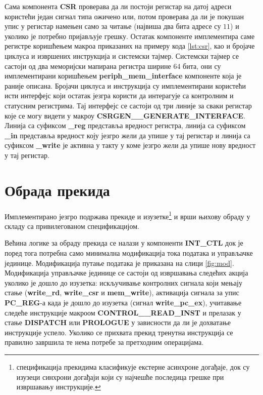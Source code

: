 Сама компонента \textbf{CSR} проверава да ли постоји регистар на датој адреси користећи један сигнал типа ожичено или, потом проверава да ли је покушан упис у регистар намењен само за читање (највиша два бита адресе су $11$) и уколико је потребно пријављује грешку. Остатак компоненте имплементира саме регистре коришћењем макроа приказаних на примеру кода \ref{lst:csr}, као и бројаче циклуса и извршених инструкција и системски тајмер. Системски тајмер се састоји од два меморијски мапирана регистра ширине 64 бита, они су имплементирани коришћењем \textbf{periph\_mem\_interface} компоненте која је раније описана. Бројачи циклуса и инструкција су имплементирани користећи исти интерфејс који остатак језгра користи да интерагује са контролним и статусним регистрима. Тај интерфејс се састоји од три линије за сваки регистар које се могу видети у макроу \textbf{CSRGEN\_\_GENERATE\_INTERFACE}. Линија са суфиксом \textbf{\_reg} представља вредност регистра, линија са суфиксом \textbf{\_in} представља вредност коју језгро жели да упише у тај регистар и линија са суфиксом \textbf{\_write} је активна у такту у коме језгро жели да упише нову вредност у тај регистар.



\section{Обрада прекида}

Имплементирано језгро подржава прекиде и изузетке\footnote{ спецификација прекидима класификује екстерне асинхроне догађаје, док су изузеци синхрони догађаји који су најчешће последица грешке при извршавању инструкције.} и врши њихову обраду у складу са привилегованом спецификацијом\cite{priv_spec}.

Већина логике за обраду прекида се налази у компоненти \textbf{INT\_CTL} док је поред тога потребна само минимална модификација тока података и управљачке јединице.
Модификација путање података је приказана на слици \ref{fig:mod}. Модификација управљачке јединице се састоји од извршавања следећих акција уколико је дошло до изузетка:
искључивање контролних сигнала који мењају стање (\textbf{write\_rd}, \textbf{write\_csr} и \textbf{mem\_write}), активација сигнала за упис \textbf{PC\_REG}-а када је дошло до изузетка (сигнал \textbf{write\_pc\_ex}), учитавање следеће инструкције макроом \textbf{CONTROL\_\_READ\_INST} и прелазак у стање \textbf{DISPATCH} или \textbf{PROLOGUE} у зависности да ли је дохватање инструкције успело. Уколико се прихвата прекид тренутна инструкција се правилно завршила те нема потребе за претходним операцијама.

